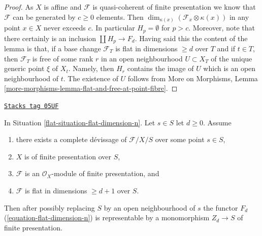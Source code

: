 \begin{proof}
As $X$ is affine and $\mathcal{F}$ is quasi-coherent of finite presentation
we know that $\mathcal{F}$ can be generated by $c \geq 0$ elements.
Then $\dim_{\kappa(x)}(\mathcal{F}_x \otimes \kappa(x))$
in any point $x \in X$ never exceeds $c$. In particular $H_p = \emptyset$
for $p > c$. Moreover, note that there certainly is an inclusion
$\coprod H_p \to F_d$. Having said this the content
of the lemma is that, if a base change $\mathcal{F}_T$ is flat in
dimensions $\geq d$ over $T$ and if $t \in T$, then $\mathcal{F}_T$ is
free of some rank $r$ in an open neighbourhood $U \subset X_T$
of the unique generic point $\xi$ of $X_t$. Namely, then $H_r$
contains the image of $U$ which is an open neighbourhood of $t$.
The existence of $U$ follows from
More on Morphisms, Lemma
\ref{more-morphisms-lemma-flat-and-free-at-point-fibre}.
\end{proof}

\begin{lemma}
\label{flat-lemma-flat-dimension-n-representable}
\href{https://stacks.math.columbia.edu/tag/05UF}{\texttt{Stacks tag 05UF}}

In Situation \ref{flat-situation-flat-dimension-n}.
Let $s \in S$ let $d \geq 0$. Assume
\begin{enumerate}
\item there exists a complete d\'evissage
of $\mathcal{F}/X/S$ over some point $s \in S$,
\item $X$ is of finite presentation over $S$,
\item $\mathcal{F}$ is an $\mathcal{O}_X$-module of finite presentation, and
\item $\mathcal{F}$ is flat in dimensions $\geq d + 1$ over $S$.
\end{enumerate}
Then after possibly replacing $S$ by an open neighbourhood
of $s$ the functor $F_d$ (\ref{equation-flat-dimension-n})
is representable by a monomorphism $Z_d \to S$ of finite presentation.
\end{lemma}

